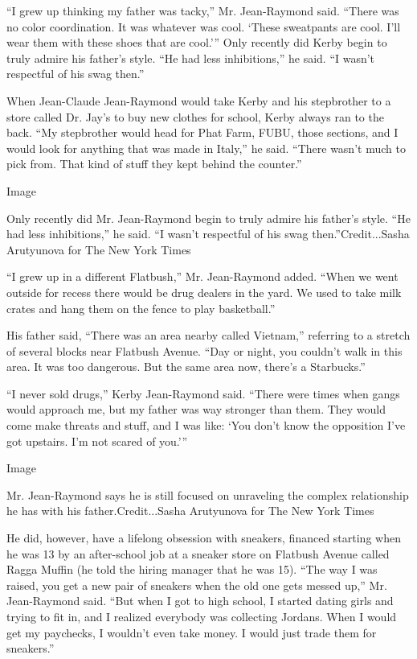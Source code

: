 ``I grew up thinking my father was tacky,'' Mr. Jean-Raymond said.
``There was no color coordination. It was whatever was cool. `These
sweatpants are cool. I'll wear them with these shoes that are cool.'''
Only recently did Kerby begin to truly admire his father's style. ``He
had less inhibitions,'' he said. ``I wasn't respectful of his swag
then.''

When Jean-Claude Jean-Raymond would take Kerby and his stepbrother to a
store called Dr. Jay's to buy new clothes for school, Kerby always ran
to the back. ``My stepbrother would head for Phat Farm, FUBU, those
sections, and I would look for anything that was made in Italy,'' he
said. ``There wasn't much to pick from. That kind of stuff they kept
behind the counter.''

Image

Only recently did Mr. Jean-Raymond begin to truly admire his father's
style. ``He had less inhibitions,'' he said. ``I wasn't respectful of
his swag then.''Credit...Sasha Arutyunova for The New York Times

``I grew up in a different Flatbush,'' Mr. Jean-Raymond added. ``When we
went outside for recess there would be drug dealers in the yard. We used
to take milk crates and hang them on the fence to play basketball.''

His father said, ``There was an area nearby called Vietnam,'' referring
to a stretch of several blocks near Flatbush Avenue. ``Day or night, you
couldn't walk in this area. It was too dangerous. But the same area now,
there's a Starbucks.''

``I never sold drugs,'' Kerby Jean-Raymond said. ``There were times when
gangs would approach me, but my father was way stronger than them. They
would come make threats and stuff, and I was like: `You don't know the
opposition I've got upstairs. I'm not scared of you.'''

Image

Mr. Jean-Raymond says he is still focused on unraveling the complex
relationship he has with his father.Credit...Sasha Arutyunova for The
New York Times

He did, however, have a lifelong obsession with sneakers, financed
starting when he was 13 by an after-school job at a sneaker store on
Flatbush Avenue called Ragga Muffin (he told the hiring manager that he
was 15). ``The way I was raised, you get a new pair of sneakers when the
old one gets messed up,'' Mr. Jean-Raymond said. ``But when I got to
high school, I started dating girls and trying to fit in, and I realized
everybody was collecting Jordans. When I would get my paychecks, I
wouldn't even take money. I would just trade them for sneakers.''

